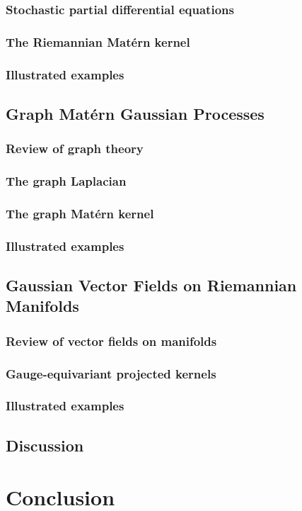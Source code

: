 \documentclass[11pt]{book}
\begin{document}
\subsection{Stochastic partial differential equations}
\subsection{The Riemannian Matérn kernel}
\subsection{Illustrated examples}

\section{Graph Matérn Gaussian Processes}

\subsection{Review of graph theory}
\subsection{The graph Laplacian}
\subsection{The graph Matérn kernel}
\subsection{Illustrated examples}

\section{Gaussian Vector Fields on Riemannian Manifolds}

\subsection{Review of vector fields on manifolds}
\subsection{Gauge-equivariant projected kernels}
\subsection{Illustrated examples}

\section{Discussion}
\label{sec:noneuclidean-discussion}





\chapter{Conclusion}
\label{ch:conclusion}

\printbibliography
\end{document}

